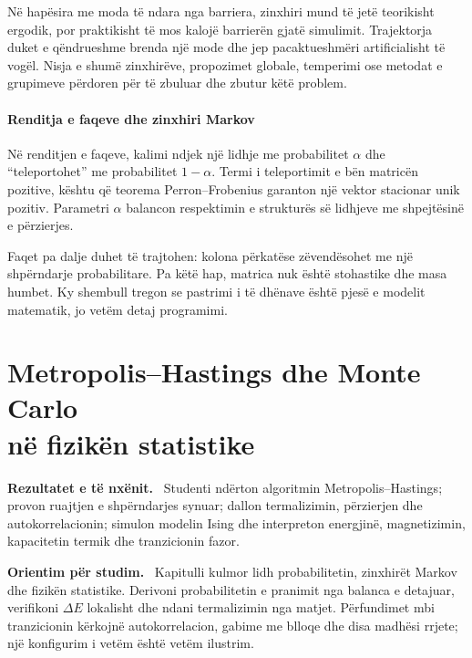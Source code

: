 \documentclass[11pt,oneside,openany]{book}
\newenvironment{qellime}{\par\medskip\noindent\textbf{Rezultatet e të nxënit.}\ }{\par\medskip}
\newenvironment{orientim}{\par\medskip\noindent\textbf{Orientim për studim.}\ }{\par\medskip}
\begin{document}
Në hapësira me moda të ndara nga barriera, zinxhiri mund të jetë teorikisht ergodik, por praktikisht të mos kalojë barrierën gjatë simulimit. Trajektorja duket e qëndrueshme brenda një mode dhe jep pacaktueshmëri artificialisht të vogël. Nisja e shumë zinxhirëve, propozimet globale, temperimi ose metodat e grupimeve përdoren për të zbuluar dhe zbutur këtë problem.

\subsubsection{Renditja e faqeve dhe zinxhiri Markov}
Në renditjen e faqeve, kalimi ndjek një lidhje me probabilitet $\alpha$ dhe ``teleportohet'' me probabilitet $1-\alpha$. Termi i teleportimit e bën matricën pozitive, kështu që teorema Perron--Frobenius garanton një vektor stacionar unik pozitiv. Parametri $\alpha$ balancon respektimin e strukturës së lidhjeve me shpejtësinë e përzierjes.

Faqet pa dalje duhet të trajtohen: kolona përkatëse zëvendësohet me një shpërndarje probabilitare. Pa këtë hap, matrica nuk është stohastike dhe masa humbet. Ky shembull tregon se pastrimi i të dhënave është pjesë e modelit matematik, jo vetëm detaj programimi.





\chapter[Metropolis--Hastings dhe Monte Carlo në fizikën statistike]{Metropolis--Hastings dhe Monte Carlo\\në fizikën statistike}
\begin{qellime}
Studenti ndërton algoritmin Metropolis--Hastings; provon ruajtjen e shpërndarjes synuar; dallon termalizimin, përzierjen dhe autokorrelacionin; simulon modelin Ising dhe interpreton energjinë, magnetizimin, kapacitetin termik dhe tranzicionin fazor.
\end{qellime}

\begin{orientim}
Kapitulli kulmor lidh probabilitetin, zinxhirët Markov dhe fizikën statistike.
Derivoni probabilitetin e pranimit nga balanca e detajuar, verifikoni
$\Delta E$ lokalisht dhe ndani termalizimin nga matjet. Përfundimet mbi
tranzicionin kërkojnë autokorrelacion, gabime me blloqe dhe disa madhësi
rrjete; një konfigurim i vetëm është vetëm ilustrim.
\end{orientim}
\end{document}
